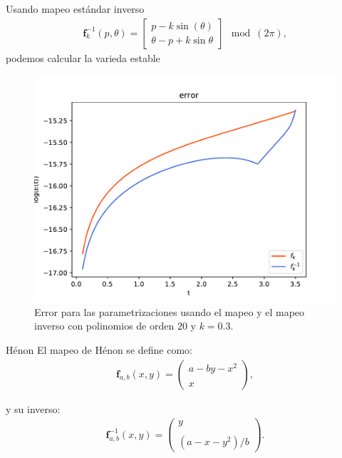 \documentclass[11pt]{beamer}
\theoremstyle{definition}
\begin{document}
\begin{frame}
Usando mapeo est\'andar inverso
\begin{eqnarray}
\mathbf{f}_{k}^{-1}(p,\theta) = \left[\begin{array}{c}
p  -k\sin(\theta) \\
\theta-p+k\sin{\theta}
\end{array}\right] \mod(2\pi), \label{mapeo estandar inverso}
\end{eqnarray}
podemos calcular la varieda estable
\begin{figure}[H]
	\centering
	\includegraphics[scale=0.4]{error_inversa}
	\caption{Error para las parametrizaciones usando el mapeo y el mapeo inverso con polinomios de orden $20$ y $k=0.3$. }
	\label{erroresinverso}
\end{figure}
\end{frame}
\begin{frame}{H\'enon}
El mapeo de Hénon se define como:
\begin{eqnarray}
\mathbf{f}_{a,b}(x,y)=\left( \begin{array}{lcc}
a-by-x^{2}\\
\\ x
\end{array}
\right), \label{Henon}
\end{eqnarray}

y su inverso:
\begin{eqnarray}
\mathbf{f}^{-1}_{a,b}(x,y)=\left( \begin{array}{lcc}
y\\
\\ (a-x-y^{2})/b
\end{array}
\right). \label{HenonI}
\end{eqnarray} 


\end{frame}
\end{document}

